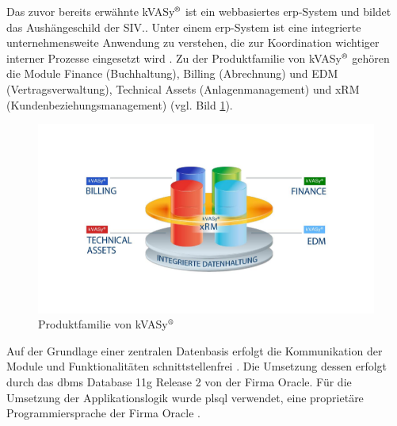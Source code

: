 Das zuvor bereits erwähnte kVASy$^\text{\textregistered}$ ist ein webbasiertes \acrshort{erp}-System und bildet das Aushängeschild der SIV.\@AG. Unter einem \acrshort{erp}-System ist eine integrierte unternehmensweite Anwendung zu verstehen, die zur Koordination wichtiger interner Prozesse eingesetzt wird \cite[Seite 482]{kjd2010}. Zu der Produktfamilie von kVASy$^\text{\textregistered}$ gehören die Module Finance (Buchhaltung), Billing (Abrechnung) und EDM (Vertragsverwaltung), Technical Assets (Anlagenmanagement) und xRM (Kundenbeziehungsmanagement) (vgl. Bild \ref{pic:kVASy:end}).
\begin{figure}[ht]
	\begin{center}
		\includegraphics[scale=0.25]{bilder/kVASy_Schema.png}
		\caption{Produktfamilie von kVASy$^\text{\textregistered}$\cite{SIV16}}
		\label{pic:kVASy:end}
	\end{center}
\end{figure}
Auf der Grundlage einer zentralen Datenbasis erfolgt die Kommunikation der Module und Funktionalitäten schnittstellenfrei \cite[Seite15]{SIV13}. Die Umsetzung dessen erfolgt durch das \acrfull{dbms} Database 11g Release 2 von der Firma Oracle. Für die Umsetzung der Applikationslogik wurde \acrfull{plsql} verwendet, eine proprietäre Programmiersprache der Firma Oracle \cite{wiki:plsql}.

